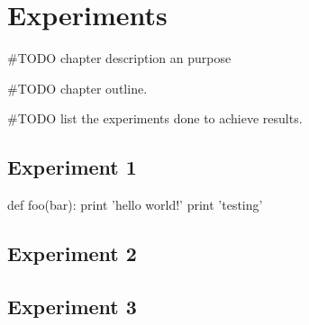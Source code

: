 \chapter{Experiments}\label{experiments}
#TODO chapter description an purpose

#TODO chapter outline. 

#TODO list the experiments done to achieve results. 
\section{Experiment 1}
\begin{python}
def foo(bar):
    print 'hello world!'
	print 'testing'
\end{python}


\section{Experiment 2}

\section{Experiment 3}

